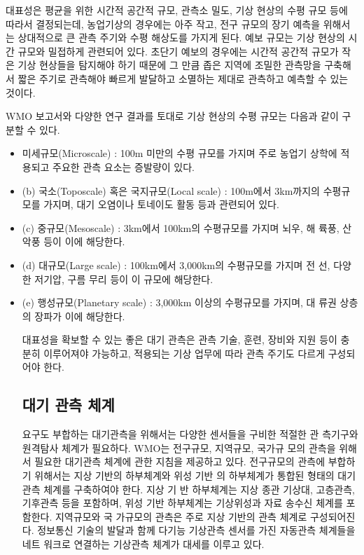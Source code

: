 대표성은 평균을 위한 시간적 공간적 규모, 관측소 밀도, 기상 현상의 수평 규모 등에 따라서 결정되는데, 농업기상의 경우에는 아주 작고, 전구 규모의 장기 예측을 위해서는 상대적으로 큰 관측 주기와 수평 해상도를 가지게 된다. 예보 규모는 기상 현상의 시간 규모와 밀접하게 관련되어 있다.
초단기 예보의 경우에는 시간적 공간적 규모가 작은 기상 현상들을 탐지해야 하기 때문에 그 만큼 좁은 지역에 조밀한 관측망을 구축해서 짧은 주기로 관측해야 빠르게 발달하고 소멸하는 제대로 관측하고 예측할 수 있는 것이다. 

WMO 보고서와 다양한 연구 결과를 토대로 기상 현상의 수평 규모는 다음과 같이 구분할 수 있다.
\begin{itemize}
	\item 미세규모(Microscale) : 100m 미만의 수평 규모를 가지며 주로 농업기
상학에 적용되고 주요한 관측 요소는 증발량이 있다.
	\item(b) 국소(Toposcale) 혹은 국지규모(Local scale) : 100m에서 3km까지의
수평규모를 가지며, 대기 오염이나 토네이도 활동 등과 관련되어 있다.
	\item(c) 중규모(Mesoscale) : 3km에서 100km의 수평규모를 가지며 뇌우, 해
륙풍, 산악풍 등이 이에 해당한다.
	\item(d) 대규모(Large scale) : 100km에서 3,000km의 수평규모를 가지며 전
선, 다양한 저기압, 구름 무리 등이 이 규모에 해당한다.
	\item(e) 행성규모(Planetary scale) : 3,000km 이상의 수평규모를 가지며, 대
류권 상층의 장파가 이에 해당한다.

대표성을 확보할 수 있는 좋은 대기 관측은 관측 기술, 훈련, 장비와 지원 등이 충분히 이루어져야 가능하고, 적용되는 기상 업무에 따라 관측 주기도 다르게 구성되어야 한다.

\subsection{대기 관측 체계}

요구도 부합하는 대기관측을 위해서는 다양한 센서들을 구비한 적절한 관
측기구와 원격탐사 체계가 필요하다. WMO는 전구규모, 지역규모, 국가규
모의 관측을 위해서 필요한 대기관측 체계에 관한 지침을 제공하고 있다.
전구규모의 관측에 부합하기 위해서는 지상 기반의 하부체계와 위성 기반
의 하부체계가 통합된 형태의 대기관측 체계를 구축하여야 한다. 지상 기
반 하부체계는 지상 종관 기상대, 고층관측, 기후관측 등을 포함하며, 위성
기반 하부체계는 기상위성과 자료 송수신 체계를 포함한다. 지역규모와 국
가규모의 관측은 주로 지상 기반의 관측 체계로 구성되어진다. 정보통신
기술의 발달과 함께 다기능 기상관측 센서를 가진 자동관측 체계들을 네트
워크로 연결하는 기상관측 체계가 대세를 이루고 있다.


\end{itemize}
